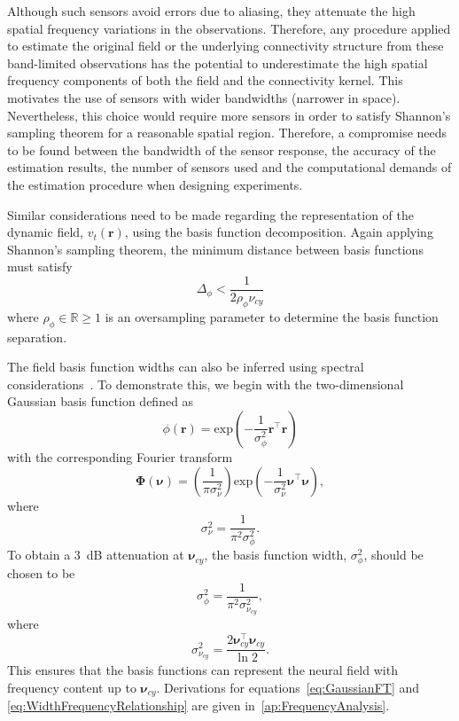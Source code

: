 \documentclass[10pt,a4paper]{article}
\begin{document}
Although such sensors avoid errors due to aliasing, they attenuate the high spatial frequency variations in the observations. Therefore, any procedure applied to estimate the original field or the underlying connectivity structure from these band-limited observations has the potential to underestimate the high spatial frequency components of both the field and the connectivity kernel. This motivates the use of sensors with wider bandwidths (narrower in space). Nevertheless, this choice would require more sensors in order to satisfy Shannon's sampling theorem for a reasonable spatial region. Therefore, a compromise needs to be found between the bandwidth of the sensor response, the accuracy of the estimation results, the number of sensors used and the computational demands of the estimation procedure when designing experiments.

Similar considerations need to be made regarding the representation of the dynamic field, $v_t(\mathbf{r})$, using the basis function decomposition. Again applying Shannon's sampling theorem, the minimum distance between basis functions must satisfy 
\begin{equation}\label{eq:BasisFunctionSeparation}
	\Delta_{\phi} < \frac{1}{2\rho_{\phi}\nu_{cy}}
\end{equation}
where $\rho_{\phi} \in \mathbb{R} \ge 1$ is an oversampling parameter to determine the basis function separation. 

The field basis function widths can also be inferred using spectral considerations~\cite{Sanner1992,Scerri2009}. To demonstrate this, we begin with the two-dimensional Gaussian basis function defined as
\begin{equation}
 \phi(\mathbf r)=\mathrm{exp}\left({-\frac{1}{\sigma_{\phi}^2} \mathbf r^\top\mathbf r}\right)
\end{equation}
with the corresponding Fourier transform
\begin{equation}\label{eq:GaussianFT}
\boldsymbol\Phi(\boldsymbol \nu)=\left(\frac{1}{\pi\sigma_{\nu}^2}\right)\mathrm{exp}\left(-\frac{1}{\sigma_{\nu}^2}\boldsymbol\nu^\top \boldsymbol\nu\right),
\end{equation}
where 
\begin{equation}\label{eq:GaussianFTWidth}
	\sigma^2_{\nu} = \frac{1}{\pi^2\sigma_{\phi}^2}. 
\end{equation}
To obtain a 3~dB attenuation at $\boldsymbol\nu_{cy}$, the basis function width, $\sigma^2_{\phi}$, should be chosen to be
\begin{equation}\label{eq:WidthCutOffRelationship}
 \sigma^2_{\phi}= \frac{1}{\pi^2\sigma_{\nu_{cy}}^2},
\end{equation}
where
\begin{equation}\label{eq:WidthFrequencyRelationship}
 \sigma^2_{\nu_{cy}}= \frac{2\boldsymbol\nu_{cy}^\top \boldsymbol\nu_{cy}}{\ln 2}.
\end{equation}
This ensures that the basis functions can represent the neural field with frequency content up to $\boldsymbol\nu_{cy}$. Derivations for equations~\ref{eq:GaussianFT} and \ref{eq:WidthFrequencyRelationship} are given in~\ref{ap:FrequencyAnalysis}.
\end{document}
